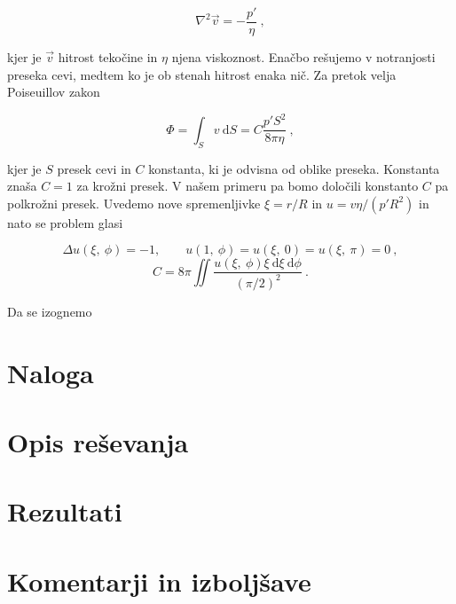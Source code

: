 \documentclass[a4paper]{article}
\newcommand{\ddd}{\mathrm{d}}
\begin{document}
\begin{equation}
    \nabla^2 \vec{v} = -\frac{p'}{\eta}\>,
    \label{eq:poisson}
\end{equation}

kjer je $\vec{v}$ hitrost tekočine in $\eta$ njena viskoznost. Enačbo rešujemo v notranjosti preseka cevi, medtem ko
je ob stenah hitrost enaka nič. Za pretok velja Poiseuillov zakon

\begin{equation}
    \Phi = \int_S{v\>\ddd S}  = C \frac{p' S^2}{8\pi\eta}\>,
    \label{eq:poiseuille}
\end{equation}

kjer je $S$ presek cevi in $C$ konstanta, ki je odvisna od oblike preseka. Konstanta znaša $C = 1$ za krožni presek.
V našem primeru pa bomo določili konstanto $C$ pa polkrožni presek. Uvedemo nove spremenljivke $\xi = r/R$ in 
$u=v\eta/(p'R^2)$ in nato se problem glasi

\begin{equation}
    \Delta u(\xi,\>\phi) = -1, \qquad u(1,\>\phi) = u(\xi,\>0) = u(\xi,\>\pi) = 0\>,
    \label{eq:poisson2}
\end{equation}
\begin{equation}
    C = 8\pi \iint{\frac{u(\xi,\>\phi)\xi\>\ddd\xi\> \ddd\phi}{(\pi/2)^2}}\>.
\end{equation}

Da se izognemo 


\section{Naloga}

\section{Opis reševanja}

\section{Rezultati}


\section{Komentarji in izboljšave}


\newpage


\end{document}
